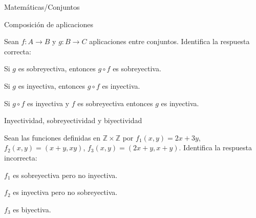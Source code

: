 \documentclass[12pt]{article}
\begin{document}
\begin{quiz}{Matemáticas/Conjuntos}
\begin{multi}[shuffle=true,numbering=none, feedback={Supongamos que $g(x)=g(y)$. Por ser, $f$ sobreyectiva, existe $u,v\in A$ tales que $f(u)=x$ y $f(v)=y$. Se tiene entonces que $g(f(u))=g(f(v))$, y como $g\circ f$ es inyectiva, se deduce que $u=v$ y por tanto $x=y$.}]{Composición de aplicaciones}

Sean $f\colon A\to B$ y $g\colon B\to C$ aplicaciones entre conjuntos.
Identifica la respuesta correcta: 
\item  Si $g$ es sobreyectiva,  entonces $g\circ f$ es sobreyectiva.
\item  Si $g$ es inyectiva, entonces $g\circ f$ es inyectiva.
\item* Si $g\circ f$ es inyectiva y $f$ es sobreyectiva entonces $g$ es inyectiva.
\end{multi}

\begin{multi}[shuffle=true,numbering=none, feedback={Por ejemplo, $f_2(1,0)=f_2(0,1)=(1,0)$, pero $(1,0)\neq (0,1)$.}]{Inyectividad, sobreyectividad y biyectividad}

Sean las funciones definidas en $\mathbb{Z}\times \mathbb{Z}$ por  $f_1(x,y)=  2x+3y$,  $f_2(x,y)=  (x+y,xy)$,  $f_3(x,y)=(2x+y,x+y)$.
Identifica la respuesta incorrecta: 
\item $f_1$ es sobreyectiva pero no inyectiva.
\item* $f_2$ es inyectiva pero no sobreyectiva.
\item $f_3$ es biyectiva.
\end{multi}

\end{quiz}
\end{document}
